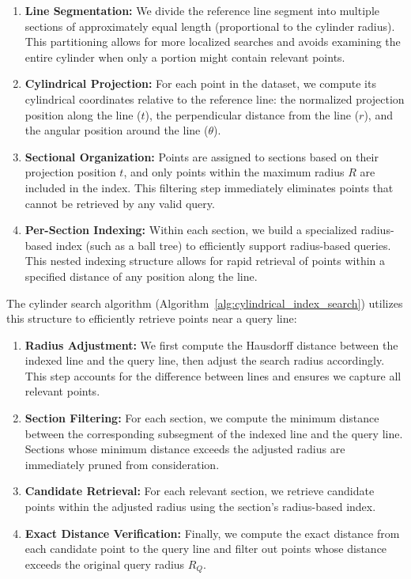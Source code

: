 \documentclass[numbers,sort]{article}
\begin{document}
\begin{enumerate}
    \item \textbf{Line Segmentation:} We divide the reference line segment into multiple sections of approximately equal length (proportional to the cylinder radius). This partitioning allows for more localized searches and avoids examining the entire cylinder when only a portion might contain relevant points.
    
    \item \textbf{Cylindrical Projection:} For each point in the dataset, we compute its cylindrical coordinates relative to the reference line: the normalized projection position along the line ($t$), the perpendicular distance from the line ($r$), and the angular position around the line ($\theta$).
    
    \item \textbf{Sectional Organization:} Points are assigned to sections based on their projection position $t$, and only points within the maximum radius $R$ are included in the index. This filtering step immediately eliminates points that cannot be retrieved by any valid query.
    
    \item \textbf{Per-Section Indexing:} Within each section, we build a specialized radius-based index (such as a ball tree) to efficiently support radius-based queries. This nested indexing structure allows for rapid retrieval of points within a specified distance of any position along the line.
\end{enumerate}

The cylinder search algorithm (Algorithm~\ref{alg:cylindrical_index_search}) utilizes this structure to efficiently retrieve points near a query line:

\begin{enumerate}
    \item \textbf{Radius Adjustment:} We first compute the Hausdorff distance between the indexed line and the query line, then adjust the search radius accordingly. This step accounts for the difference between lines and ensures we capture all relevant points.
    
    \item \textbf{Section Filtering:} For each section, we compute the minimum distance between the corresponding subsegment of the indexed line and the query line. Sections whose minimum distance exceeds the adjusted radius are immediately pruned from consideration.
    
    \item \textbf{Candidate Retrieval:} For each relevant section, we retrieve candidate points within the adjusted radius using the section's radius-based index.
    
    \item \textbf{Exact Distance Verification:} Finally, we compute the exact distance from each candidate point to the query line and filter out points whose distance exceeds the original query radius $R_Q$.
\end{enumerate}
\end{document}
